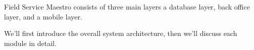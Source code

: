 Field Service Maestro consists of three main layers a database layer, back office layer, and a mobile layer.

We'll first introduce the overall system architecture, then we'll discuss each module in detail.